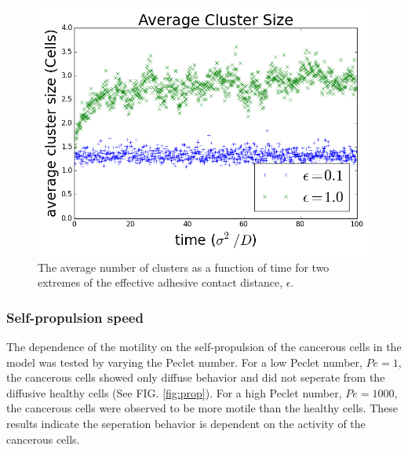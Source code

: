 \documentclass[aps,prb,twocolumn,groupedaddress,nofootinbib,floatfix]{revtex4}
\begin{document}
\begin{figure}
  \includegraphics[width=1.0\columnwidth]{images/avg_clusters.png}
  \caption{The average number of clusters as a function of time for two extremes of the effective adhesive contact distance, $\epsilon$.}
  \label{fig:clusters}
\end{figure}




\subsubsection{Self-propulsion speed}

The dependence of the motility on the self-propulsion of the cancerous cells in the model was tested by varying the Peclet number.
For a low Peclet number, $Pe=1$, the cancerous cells showed only diffuse behavior and did not seperate from the diffusive healthy cells (See FIG. \ref{fig:prop}).
For a high Peclet number, $Pe=1000$, the cancerous cells were observed to be more motile than the healthy cells.
These results indicate the seperation behavior is dependent on the activity of the cancerous cells.
\end{document}
